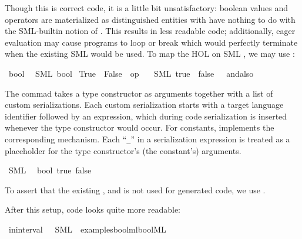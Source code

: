 \begin{isabellebody}
\begin{isamarkuptext}
  \noindent Though this is correct code, it is a little bit unsatisfactory:
  boolean values and operators are materialized as distinguished
  entities with have nothing to do with the SML-builtin notion
  of .  This results in less readable code;
  additionally, eager evaluation may cause programs to
  loop or break which would perfectly terminate when
  the existing SML  would be used.  To map
  the HOL  on SML , we may use
  :%
\end{isamarkuptext}%
\isamarkuptrue%
%
\isadelimtt
%
\endisadelimtt
%
\isatagtt
{}\isamarkupfalse%
\ bool\isanewline
\ \ {\isacharparenleft}SML\ {\isachardoublequoteopen}bool{\isachardoublequoteclose}{\isacharparenright}\isanewline
{}\isamarkupfalse%
\ True\ \ False\ \ {\isachardoublequoteopen}op\ {\isasymand}{\isachardoublequoteclose}\isanewline
\ \ {\isacharparenleft}SML\ {\isachardoublequoteopen}true{\isachardoublequoteclose}\ \ {\isachardoublequoteopen}false{\isachardoublequoteclose}\ \ {\isachardoublequoteopen}{\isacharunderscore}\ andalso\ {\isacharunderscore}{\isachardoublequoteclose}{\isacharparenright}%
\endisatagtt
{\isafoldtt}%
%
\isadelimtt
%
\endisadelimtt
%
\begin{isamarkuptext}%
The \isa{{\isasymCODETYPE}} commad takes a type constructor
  as arguments together with a list of custom serializations.
  Each custom serialization starts with a target language
  identifier followed by an expression, which during
  code serialization is inserted whenever the type constructor
  would occur.  For constants, \isa{{\isasymCODECONST}} implements
  the corresponding mechanism.  Each ``\verb|_|'' in
  a serialization expression is treated as a placeholder
  for the type constructor's (the constant's) arguments.%
\end{isamarkuptext}%
\isamarkuptrue%
\isamarkupfalse%
\ SML\isanewline
\ \ bool\ true\ false%
\begin{isamarkuptext}%
To assert that the existing ,  and 
  is not used for generated code, we use \isa{{\isasymCODERESERVED}}.

  After this setup, code looks quite more readable:%
\end{isamarkuptext}%
\isamarkuptrue%
\isamarkupfalse%
\ in{\isacharunderscore}interval\ \ \ SML\ \ {\isachardoublequoteopen}examples{\isacharslash}bool{\isacharunderscore}mlbool{\isachardot}ML{\isachardoublequoteclose}%
\begin{isamarkuptext}%


\end{isamarkuptext}
\end{isabellebody}
